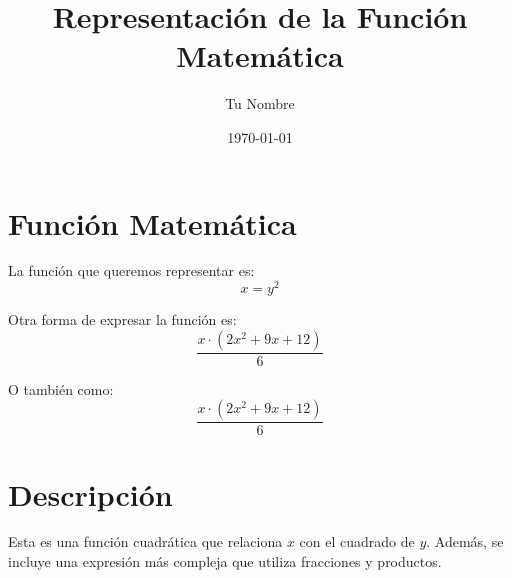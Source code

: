 \documentclass{article}
\begin{document}
\title{Representación de la Función Matemática}
\author{Tu Nombre}
\date{\today}
\maketitle

\section*{Función Matemática}
La función que queremos representar es:
\[
x = y^2
\]

Otra forma de expresar la función es:
\[
\frac{x \cdot \left(2x^2 + 9x + 12\right)}{6}
\]

O también como:
\[
\frac{x \cdot (2x^2 + 9x + 12)}{6}
\]

\section*{Descripción}
Esta es una función cuadrática que relaciona \( x \) con el cuadrado de \( y \). Además, se incluye una expresión más compleja que utiliza fracciones y productos.
\end{document}
